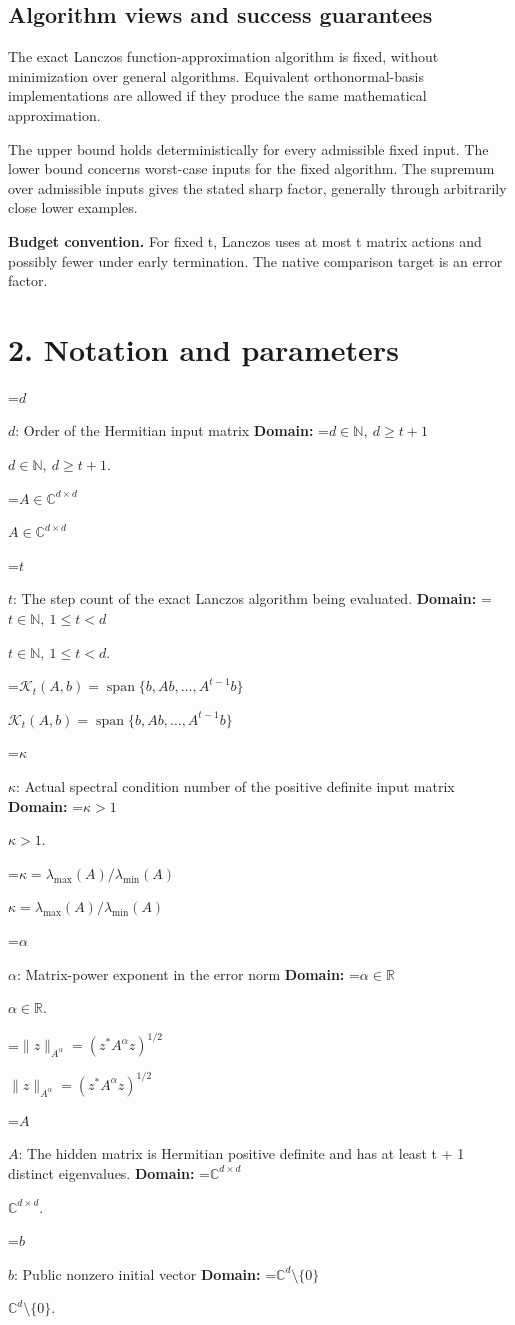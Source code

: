 \documentclass[10pt,a4paper]{article}
\newcommand{\AtlasMath}[1]{\par\begingroup\centering\setbox0=\hbox{$\displaystyle #1$}\ifdim\wd0>1.4\linewidth\typeout{ATLAS WIDE FORMULA: \the\wd0}\fi\ifdim\wd0>\linewidth\resizebox{\linewidth}{!}{\box0}\else\box0\fi\par\endgroup}
\newcommand{\AtlasInlineMath}[1]{\begingroup\setbox0=\hbox{$#1$}\ifdim\wd0>.4\linewidth\endgroup\AtlasMath{#1}\else\endgroup$#1$\fi}
\begin{document}
\subsection{Algorithm views and success guarantees}
The exact Lanczos function-approximation algorithm is fixed, without minimization over general algorithms. Equivalent orthonormal-basis implementations are allowed if they produce the same mathematical approximation.

The upper bound holds deterministically for every admissible fixed input. The lower bound concerns worst-case inputs for the fixed algorithm. The supremum over admissible inputs gives the stated sharp factor, generally through arbitrarily close lower examples.

\textbf{Budget convention.} For fixed t, Lanczos uses at most t matrix actions and possibly fewer under early termination. The native comparison target is an error factor.

\section{2. Notation and parameters}
\AtlasInlineMath{d}: Order of the Hermitian input matrix \textbf{Domain:} \AtlasInlineMath{d\in\mathbb N,\ d\ge t+1}.

\AtlasInlineMath{A\in\mathbb C^{d\times d}}

\AtlasInlineMath{t}: The step count of the exact Lanczos algorithm being evaluated. \textbf{Domain:} \AtlasInlineMath{t\in\mathbb N,\ 1\le t<d}.

\AtlasInlineMath{\mathcal K_t(A,b)=\operatorname{span}\{b,Ab,\ldots,A^{t-1}b\}}

\AtlasInlineMath{\kappa}: Actual spectral condition number of the positive definite input matrix \textbf{Domain:} \AtlasInlineMath{\kappa>1}.

\AtlasInlineMath{\kappa=\lambda_{\max}(A)/\lambda_{\min}(A)}

\AtlasInlineMath{\alpha}: Matrix-power exponent in the error norm \textbf{Domain:} \AtlasInlineMath{\alpha\in\mathbb R}.

\AtlasInlineMath{\|z\|_{A^\alpha}=(z^*A^\alpha z)^{1/2}}

\AtlasInlineMath{A}: The hidden matrix is Hermitian positive definite and has at least t + 1 distinct eigenvalues. \textbf{Domain:} \AtlasInlineMath{\mathbb C^{d\times d}}.

\AtlasInlineMath{b}: Public nonzero initial vector \textbf{Domain:} \AtlasInlineMath{\mathbb C^d\setminus\{0\}}.
\end{document}
